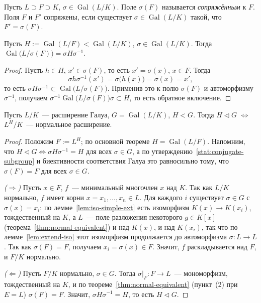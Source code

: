 \documentclass[12pt]{article}
\begin{document}
	\begin{definition}
		Пусть $L \supset F \supset K$, $\sigma \in \operatorname{Gal}(L/K)$. Поле $\sigma(F)$ называется \emph{сопряжённым} к $F$. Поля $F$ и $F'$ сопряжены, если существует $\sigma \in \operatorname{Gal}(L/K)$ такой, что $F' = \sigma(F)$.
	\end{definition}

	\begin{statement}\label{stat:conjugate-subgroup}
		Пусть $H := \operatorname{Gal}(L/F) < \operatorname{Gal}(L/K)$, $\sigma \in \operatorname{Gal}(L/K)$. Тогда $\operatorname{Gal}\bigl(L/\sigma(F)\bigr) = \sigma H \sigma^{-1}$.
	\end{statement}
	\begin{proof}
		Пусть $h \in H$, $x' \in \sigma(F)$, то есть $x' = \sigma(x)$, $x \in F$. Тогда
		\[
			\sigma h \sigma^{-1}(x') = \sigma\bigl(h(x)\bigr) = \sigma(x) = x',
		\]
		то есть $\sigma H \sigma^{-1} \subset \operatorname{Gal}\bigl(L/\sigma(F)\bigr)$. Применив это к полю $\sigma(F)$ и автоморфизму $\sigma^{-1}$, получаем $\sigma^{-1} \operatorname{Gal}\bigl(L/\sigma(F)\bigr) \sigma \subset H$, то есть обратное включение.
	\end{proof}

	\begin{theorem}\label{thm:galois-normal-subgroup}
		Пусть $L/K$~--- расширение Галуа, $G = \operatorname{Gal}(L/K)$, $H < G$. Тогда $H \vartriangleleft G$ $\Leftrightarrow$ $L^H/K$~--- нормальное расширение.
	\end{theorem}
	\begin{proof}
		Положим $F := L^H$; по основной теореме $H = \operatorname{Gal}(L/F)$. Напомним, что $H \vartriangleleft G \Leftrightarrow \sigma H \sigma^{-1} = H$ для всех $\sigma \in G$, а по утверждению~\ref{stat:conjugate-subgroup} и биективности соответствия Галуа это равносильно тому, что $\sigma(F) = F$ для всех $\sigma \in G$.

		\emph{($\Rightarrow$)} Пусть $x \in F$, $f$~--- минимальный многочлен $x$ над $K$. Так как $L/K$ нормально, $f$ имеет корни $x = x_1, \ldots, x_n \in L$. Для каждого $i$ существует $\sigma \in G$ с $\sigma(x) = x_i$: по лемме~\ref{lem:iso-simple-ext} есть изоморфизм $K(x) \to K(x_i)$, тождественный на $K$, а $L$~--- поле разложения некоторого $g \in K[x]$ (теорема~\ref{thm:normal-equivalent}) и над $K(x)$, и над $K(x_i)$, так что по лемме~\ref{lem:extend-iso} этот изоморфизм продолжается до автоморфизма $\sigma: L \to L$. Так как $\sigma(F) = F$, получаем $x_i = \sigma(x) \in F$. Значит, $f$ раскладывается над $F$, и $F/K$ нормально.

		\emph{($\Leftarrow$)} Пусть $F/K$ нормально, $\sigma \in G$. Тогда $\sigma|_F: F \to L$~--- мономорфизм, тождественный на $K$, и по теореме~\ref{thm:normal-equivalent} (пункт~(2) при $E = L$) $\sigma(F) = F$. Значит, $\sigma H \sigma^{-1} = H$, то есть $H \vartriangleleft G$.
	\end{proof}
\end{document}

